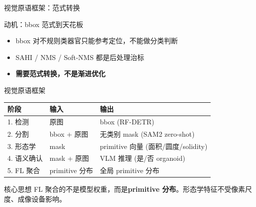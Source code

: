 \documentclass[aspectratio=169, 10pt]{beamer}
\begin{document}
\begin{frame}{视觉原语框架：范式转换}
  \begin{alertblock}{动机：bbox 范式到天花板}
    \begin{itemize}
      \item bbox 对不规则类器官只能参考定位，不能做分类判断
      \item SAHI / NMS / Soft-NMS 都是后处理治标
      \item \textbf{需要范式转换，不是渐进优化}
    \end{itemize}
  \end{alertblock}
  \vspace{0em}
  \begin{block}{视觉原语框架}
    \begin{tabular}{lll}
      \toprule
      \textbf{阶段} & \textbf{输入} & \textbf{输出} \\
      \midrule
      1. 检测 & 原图 & bbox (RF-DETR) \\
      2. 分割 & bbox + 原图 & 无类别 mask (SAM2 zero-shot) \\
      3. 形态学 & mask & primitive 向量 (面积/圆度/solidity) \\
      4. 语义确认 & mask + 原图 & VLM 推理 (是/否 organoid) \\
      5. FL 聚合 & primitive 分布 & 全局 primitive 分布 \\
      \bottomrule
    \end{tabular}
  \end{block}
  \vspace{0em}
  \begin{alertblock}{核心思想}
    FL 聚合的不是模型权重，而是\textbf{primitive 分布}。形态学特征不受像素尺度、成像设备影响。
  \end{alertblock}
\end{frame}
\end{document}
